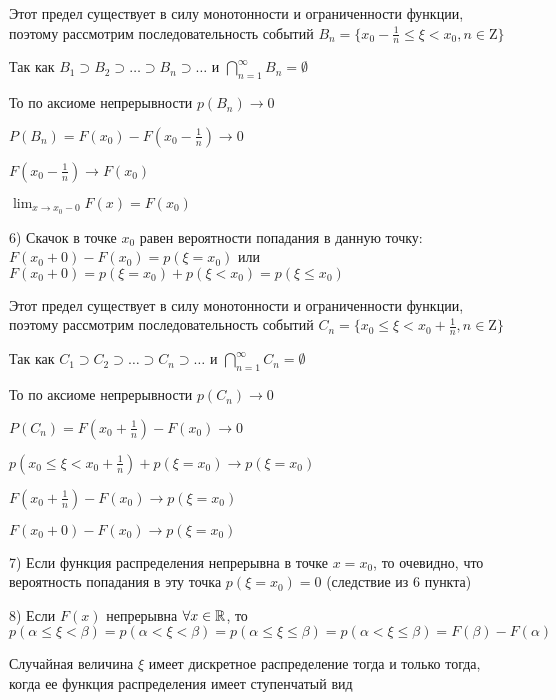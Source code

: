 \documentclass[12pt]{article}
\begin{document}
    \begin{MyProof}
        Этот предел существует в силу монотонности и ограниченности функции, поэтому рассмотрим последовательность событий $B_n = \{x_0 - \frac{1}{n} \leq \xi < x_0, n \in \mathrm{Z}\}$

        Так как $B_1 \supset B_2 \supset \dots \supset B_n \supset \dots$ и $\bigcap_{n = 1}^\infty B_n = \emptyset$

        То по аксиоме непрерывности $p(B_n) \to 0$

        $P(B_n) = F(x_0) - F(x_0 - \frac{1}{n}) \rightarrow 0$

        $F(x_0 - \frac{1}{n}) \to F(x_0)$

        $\lim_{x \to x_0 - 0} F(x) = F(x_0)$
    \end{MyProof}
    
    6) Скачок в точке $x_0$ равен вероятности попадания в данную точку: $F(x_0 + 0) - F(x_0) = p(\xi = x_0)$ или $F(x_0 + 0) = p(\xi = x_0) + p(\xi < x_0) = p(\xi \leq x_0)$

    
    \begin{MyProof}
        Этот предел существует в силу монотонности и ограниченности функции, поэтому рассмотрим последовательность событий $C_n = \{x_0 \leq \xi < x_0 + \frac{1}{n}, n \in \mathrm{Z}\}$

        Так как $C_1 \supset C_2 \supset \dots \supset C_n \supset \dots$ и $\bigcap_{n = 1}^\infty C_n = \emptyset$

        То по аксиоме непрерывности $p(C_n) \to 0$

        $P(C_n) = F(x_0 + \frac{1}{n}) - F(x_0) \rightarrow 0$

        $p(x_0 \leq \xi < x_0 + \frac{1}{n}) + p(\xi = x_0) \rightarrow p(\xi = x_0)$

        $F(x_0 + \frac{1}{n}) - F(x_0) \to p(\xi = x_0)$

        $F(x_0 + 0) - F(x_0) \to p(\xi = x_0)$
    \end{MyProof}
    
    7) Если функция распределения непрерывна в точке $x = x_0$, то очевидно, что вероятность попадания в эту точка $p(\xi = x_0) = 0$ (следствие из 6 пункта)
    
    8) Если $F(x)$ непрерывна $\forall x \in \mathbb{R}$, то $p(\alpha \leq \xi < \beta) = p(\alpha < \xi < \beta) = p(\alpha \leq \xi \leq \beta) = p(\alpha < \xi \leq \beta) = F(\beta) - F(\alpha)$
    
    \begin{MyTheorem}
        \Ths Случайная величина $\xi$ имеет дискретное распределение тогда и только тогда, когда ее функция распределения имеет ступенчатый вид
    \end{MyTheorem}
\end{document}
